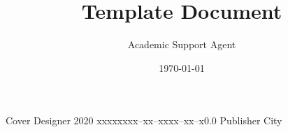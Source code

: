 \documentclass{article}
\title{Template Document}
\author{Academic Support Agent}
\date{\today}
\begin{document}
\maketitle

\tsbook{  \LaTeX{}}
       {   }
       {Cover Designer}
       {2020}
       {xxxxx}{xxx--xx--xxxx--xx--x}{0.0}
       {Publisher}
       {City}






\printbibliography{}

\end{document}
